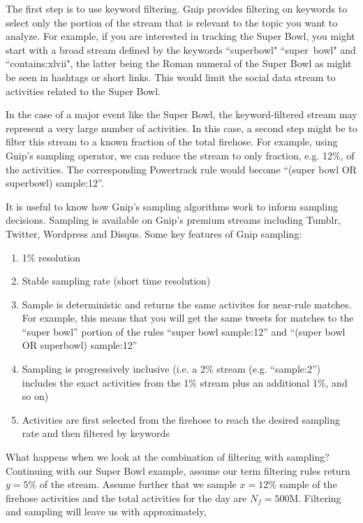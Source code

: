 \documentclass{article}
\begin{document}
The first step is to use keyword filtering.  Gnip provides filtering on keywords to select only the portion of the stream
that is relevant to the topic you want to analyze. For example, if you are interested in tracking the Super Bowl, you 
might start with a broad stream defined by the keywords ``superbowl" ``super~bowl" and ``contains:xlvii", the 
latter being the Roman numeral of the Super Bowl as might be seen in hashtags or short links. This would limit the 
social data stream to activities related to the Super Bowl.

In the case of a major event like the Super Bowl, the keyword-filtered stream may represent a very large number
of activities.  In this case, a second step might be to filter this stream to a known fraction of the total firehose. For 
example, using Gnip's sampling operator, we can reduce the stream to only fraction, e.g. 12\%, of the activities. 
The corresponding Powertrack rule would become  ``(super bowl OR superbowl) sample:12''.

It is useful to know how Gnip's sampling algorithms work to inform sampling decisions.  Sampling is available on
Gnip's premium streams including Tumblr, Twitter, Wordpress and Disqus. Some key features of Gnip sampling:

\begin{enumerate}
	\item 1\% resolution
	\item Stable sampling rate (short time resolution)
	\item Sample is deterministic and returns the same activites for near-rule matches.  For example, this means
	that you will get the same tweets for matches to the ``super bowl'' portion of the rules ``super bowl sample:12'' 
	and ``(super bowl OR superbowl) sample:12''
	\item Sampling is progressively inclusive (i.e. a 2\% stream (e.g. ``sample:2'') includes the exact activities from
	the 1\% stream plus an 
	additional 1\%,  and so on)
	\item Activities are first selected from the firehose to reach the desired sampling rate and then filtered by keywords 
\end{enumerate}

What happens when we look at the combination of filtering with sampling?  Continuing with our Super Bowl example, 
assume our term filtering rules return $y=5\%$ of the stream. Assume further that we sample $x=12\%$ sample of 
the firehose activities and the total activities for the day are $N_f=500$M. Filtering and sampling will leave us with 
approximately,
\end{document}
